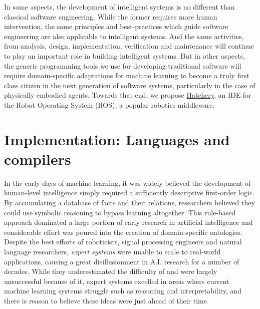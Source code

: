 \documentclass[12pt,initial,twoside,maitrise]{dms}
\numberwithin{equation}{section}
\numberwithin{table}{chapter}
\numberwithin{figure}{chapter}
\begin{document}
In some aspects, the development of intelligent systems is no different than classical software engineering. While the former requires more human intervention, the same principles and best-practices which guide software engineering are also applicable to intelligent systems. And the same activities, from analysis, design, implementation, verification and maintenance will continue to play an important role in building intelligent systems. But in other aspects, the generic programming tools we use for developing traditional software will require domain-specific adaptations for machine learning to become a truly first class citizen in the next generation of software systems, particularly in the case of physically embodied agents. Towards that end, we propose \href{https://github.com/duckietown/hatchery}{Hatchery}, an IDE for the Robot Operating System (ROS), a popular robotics middleware.

\section{Implementation: Languages and compilers}

In the early days of machine learning, it was widely believed the development of human-level intelligence simply required a sufficiently descriptive first-order logic. By accumulating a database of facts and their relations, researchers believed they could use symbolic reasoning to bypass learning altogether. This rule-based approach dominated a large portion of early research in artificial intelligence and considerable effort was poured into the creation of domain-specific ontologies. Despite the best efforts of roboticists, signal processing engineers and natural language researchers, \textit{expert systems} were unable to scale to real-world applications, causing a great disillusionment in A.I. research for a number of decades. While they underestimated the difficulty of  and were largely unsuccessful because of it, expert systems excelled in areas where current machine learning systems struggle such as reasoning and interpretability, and there is reason to believe these ideas were just ahead of their time.
\end{document}
